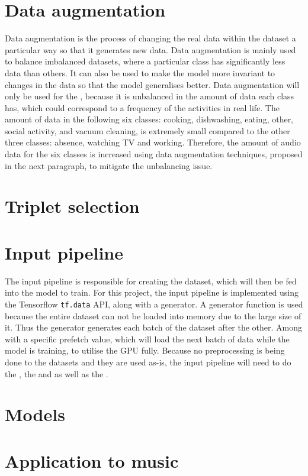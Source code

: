 \section{Data augmentation}
\label{sec:Data-Augmentation}
Data augmentation is the process of changing the real data within the dataset a particular way so that it generates new data. Data augmentation is mainly used to balance imbalanced datasets, where a particular class has significantly less data than others. It can also be used to make the model more invariant to changes in the data so that the model generalises better.
\newline
\newline
Data augmentation will only be used for the , because it is unbalanced in the amount of data each class has, which could correspond to a frequency of the activities in real life. The amount of data in the following six classes: cooking, dishwashing, eating, other, social activity, and vacuum cleaning, is extremely small compared to the other three classes: absence, watching TV and working. Therefore, the amount of audio data for the six classes is increased using data augmentation techniques, proposed in the next paragraph, to mitigate the unbalancing issue.

\section{Triplet selection}
\label{sec:Triplet-Selection}

\section{Input pipeline}
\label{sec:Input-Pipeline}
The input pipeline is responsible for creating the dataset, which will then be fed into the model to train. For this project, the input pipeline is implemented using the Tensorflow \texttt{tf.data} API, along with a generator. A generator function is used because the entire dataset can not be loaded into memory due to the large size of it. Thus the generator generates each batch of the dataset after the other. Among with a specific prefetch value, which will load the next batch of data while the model is training, to utilise the \gls{GPU} fully.
\newline
\newline
Because no preprocessing is being done to the datasets and they are used as-is, the input pipeline will need to do the , the  and as well as the .

\section{Models}
\label{sec:Models}

\section{Application to music}
\label{sec:Application-Music}
